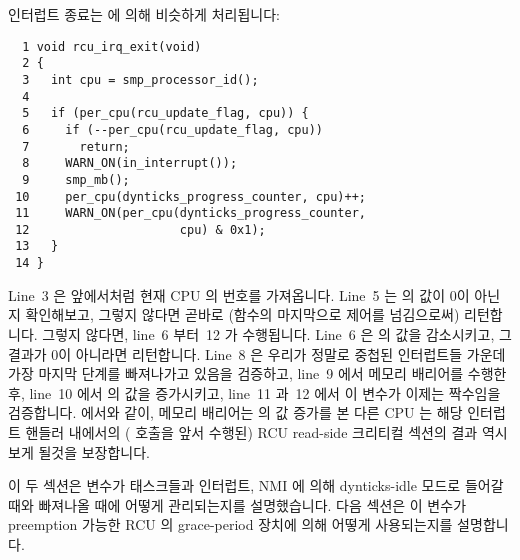 인터럽트 종료는  에 의해 비슷하게 처리됩니다:
\iffalse

Interrupt exit is handled similarly by
\co{rcu_irq_exit()}:
\fi

{ \scriptsize
\begin{verbatim}
  1 void rcu_irq_exit(void)
  2 {
  3   int cpu = smp_processor_id();
  4
  5   if (per_cpu(rcu_update_flag, cpu)) {
  6     if (--per_cpu(rcu_update_flag, cpu))
  7       return;
  8     WARN_ON(in_interrupt());
  9     smp_mb();
 10     per_cpu(dynticks_progress_counter, cpu)++;
 11     WARN_ON(per_cpu(dynticks_progress_counter,
 12                     cpu) & 0x1);
 13   }
 14 }
\end{verbatim}
}

Line~3 은 앞에서처럼 현재 CPU 의 번호를 가져옵니다.
Line~5 는  의 값이 0이 아닌지 확인해보고, 그렇지 않다면
곧바로 (함수의 마지막으로 제어를 넘김으로써) 리턴합니다.
그렇지 않다면, line~6 부터~12 가 수행됩니다.
Line~6 은  의 값을 감소시키고, 그 결과가 0이 아니라면
리턴합니다.
Line~8 은 우리가 정말로 중첩된 인터럽트들 가운데 가장 마지막 단계를 빠져나가고
있음을 검증하고, line~9 에서 메모리 배리어를 수행한 후, line~10 에서
 의 값을 증가시키고, line~11 과~12 에서 이 변수가
이제는 짝수임을 검증합니다.
 에서와 같이, 메모리 배리어는
 의 값 증가를 본 다른 CPU 는 해당 인터럽트 핸들러
내에서의 ( 호출을 앞서 수행된) RCU read-side 크리티컬 섹션의
결과 역시 보게 될것을 보장합니다.
\iffalse

Line~3 fetches the current CPU's number, as before.
Line~5 checks to see if the \co{rcu_update_flag} is
non-zero, returning immediately (via falling off the end of the
function) if not.
Otherwise, lines~6 through~12 come into play.
Line~6 decrements \co{rcu_update_flag}, returning
if the result is not zero.
Line~8 verifies that we are indeed leaving the outermost
level of nested interrupts, line~9 executes a memory barrier,
line~10 increments \co{dynticks_progress_counter},
and lines~11 and~12 verify that this variable is now even.
As with \co{rcu_enter_nohz()}, the memory barrier ensures that
any other CPU that sees the increment of
\co{dynticks_progress_counter}
will also see the effects of an RCU read-side critical section
in the interrupt handler (preceding the \co{rcu_irq_exit()}
invocation).
\fi

이 두 섹션은  변수가 태스크들과 인터럽트, NMI
에 의해 dynticks-idle 모드로 들어갈 때와 빠져나올 때에 어떻게 관리되는지를
설명했습니다.
다음 섹션은 이 변수가 preemption 가능한 RCU 의 grace-period 장치에 의해 어떻게
사용되는지를 설명합니다.
\iffalse

